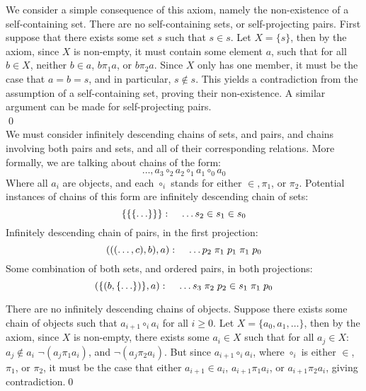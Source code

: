 \documentclass[11pt]{article}
\newcommand{\pleft}{\mathrel{\pi_1}}
\newcommand{\pright}{\mathrel{\pi_2}}
\theoremstyle{definition}
\theoremstyle{theorem}
\theoremstyle{lemma}
\begin{document}
We consider a simple consequence of this axiom, namely the non-existence of a self-containing set.
\theorem There are no self-containing sets, or self-projecting pairs.
\proof First suppose that there exists some set $s$ such that $s\in s$.
Let $X = \{s\}$, then by the axiom, since $X$ is non-empty, it must contain some element $a$, such that for all $b\in X$, neither $b\in a$, $b\pleft a$, or $b\pright a$.
Since $X$ only has one member, it must be the case that $a=b=s$, and in particular, $s\notin s$.
This yields a contradiction from the assumption of a self-containing set, proving their non-existence.
A similar argument can be made for self-projecting pairs.\\
\qed \\

\noindent
We must consider infinitely descending chains of sets, and pairs, and chains involving both pairs and sets, and all of their corresponding relations.
More formally, we are talking about chains of the form:
$$\ldots, a_3 \mathrel{\circ_2} a_2 \mathrel{\circ_1} a_1 \mathrel{\circ_0} a_0$$
Where all $a_i$ are objects, and each $\circ_i$ stands for either $\in, \pleft$, or $\pright$. Potential instances of chains of this form are infinitely descending chain of sets:
  $$\{\{\{\ldots\}\}\}:\hspace{4mm}\ldots s_2 \in s_1 \in s_0$$
Infinitely descending chain of pairs, in the first projection:
  $$(((\ldots, c),b),a):\hspace{4mm}\ldots p_2 \pleft p_1 \pleft p_0$$
Some combination of both sets, and ordered pairs, in both projections:
  $$(\{(b, \{\ldots\})\}, a):\hspace{4mm}\ldots s_3 \pright p_2 \in s_1 \pleft p_0$$

\theorem There are no infinitely descending chains of objects.
\proof Suppose there exists some chain of objects such that $a_{i+1} \mathrel{\circ_i} a_i$ for all $i\geq 0$. Let $X = \{a_0, a_1, \ldots\}$, then by the axiom, since $X$ is non-empty, there exists some $a_i \in X$ such that for all $a_j\in X$: $a_j \notin a_i$ $\neg(a_j\pleft a_i)$, and $\neg (a_j\pright a_i)$.
But since $a_{i+1} \mathrel{\circ_i} a_i$,
where $\mathrel{\circ_i}$ is either $\in$, $\pleft$, or $\pright$, it must be the case that either $a_{i+1} \in a_i$, $a_{i+1}\pleft a_i$, or $a_{i+1}\pright a_i$, giving contradiction.\qed
\end{document}
